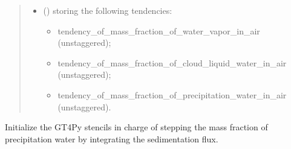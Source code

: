 \documentclass[letterpaper,10pt,english]{sphinxmanual}
\begin{document}
\begin{fulllineitems}
\begin{fulllineitems}
\begin{quote}
\begin{description}
\begin{itemize}
\begin{itemize}
\end{itemize}


\item {} 
 () \textendash{} 
{\hyperref[\detokenize{api:storages.grid_data.GridData}]{}} storing the following tendencies:
\begin{itemize}
\item {} 
tendency\_of\_mass\_fraction\_of\_water\_vapor\_in\_air (unstaggered);

\item {} 
tendency\_of\_mass\_fraction\_of\_cloud\_liquid\_water\_in\_air (unstaggered);

\item {} 
tendency\_of\_mass\_fraction\_of\_precipitation\_water\_in\_air (unstaggered).

\end{itemize}


\end{itemize}

\end{description}\end{quote}

\end{fulllineitems}


\begin{fulllineitems}
\label{\detokenize{api:dycore.prognostic_isentropic_centered.PrognosticIsentropicCentered._stencils_stepping_by_integrating_sedimentation_flux_initialize}}
Initialize the GT4Py stencils in charge of stepping the mass fraction of precipitation water by
integrating the sedimentation flux.

\end{fulllineitems}



\end{fulllineitems}
\end{document}
